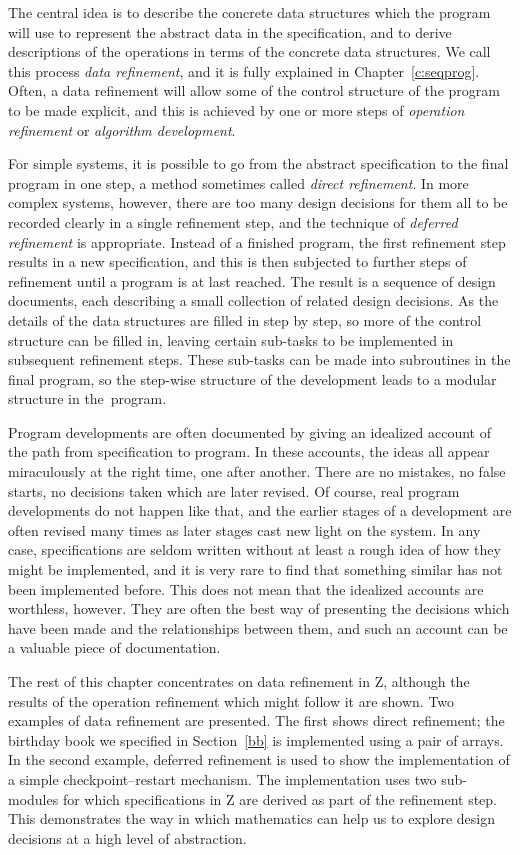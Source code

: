 The central idea is to describe the concrete data structures which the
program will use to represent the abstract data in the specification,
and to derive descriptions of the operations in terms of the concrete
data structures. We call this process {\em data refinement}, and it is
fully explained in Chapter~\ref{c:seqprog}.  Often, a data refinement
will allow some of the control structure of the program to be made
explicit, and this is achieved by one or more steps of {\em operation
refinement\/} or {\em algorithm development}.

For simple systems, it is possible to go from the abstract specification
to the final program in one step, a method sometimes called {\em direct
refinement}. In more complex systems, however, there are too many design
decisions for them all to be recorded clearly in a single refinement step,
and the technique of {\em deferred refinement\/} is appropriate.
Instead of a finished program, the first refinement step results in a new
specification, and this is then subjected to further steps of refinement until
a program is at last reached. The result is a sequence of design documents,
each describing a small collection of related design decisions. As the
details of the data structures are filled in step by step, so more of the
control structure can be filled in, leaving certain sub-tasks to be
implemented in subsequent refinement steps. These sub-tasks can be made
into subroutines in the final program, so the step-wise structure of the
development leads to a modular structure in the~program.

Program developments are often documented by giving an idealized
account of the path from specification to program. In these accounts,
the ideas all appear miraculously at the right time, one after
another. There are no mistakes, no false starts, no decisions taken
which are later revised. Of course, real program developments do not
happen like that, and the earlier stages of a development are often
revised many times as later stages cast new light on the system. In
any case, specifications are seldom written without at least a rough
idea of how they might be implemented, and it is very rare to find
that something similar has not been implemented before.
This does not mean that the idealized accounts are worthless, however.
They are often the best way of presenting the decisions which have been made
and the relationships between them, and such an account can be a valuable
piece of documentation.

The rest of this chapter concentrates on data refinement
in Z, although the results of the operation refinement which might
follow it are shown.  Two examples of data refinement are presented.
The first shows direct refinement; the birthday book we specified in
Section~\ref{bb} is implemented using a pair of arrays. In the second
example, deferred refinement is used to show the implementation of a
simple checkpoint--restart mechanism.  The implementation uses two
sub-modules for which specifications in Z are derived as part of the
refinement step. This demonstrates the way in which mathematics can
help us to explore design decisions at a high level of abstraction.

